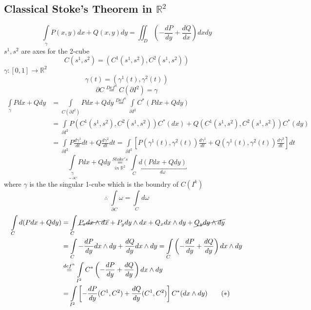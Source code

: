 \documentclass[11pt]{article}
\def\RR{\mathbb{R}}
\begin{document}
\subsection{Classical Stoke's Theorem in $\RR^2$}
\[\int\limits_{\gamma} P(x,y) dx + Q(x,y)dy = \iint_{D} \left( - \frac{dP}{dy} + \frac{dQ}{dx} \right) dxdy\]
$s^1, s^2$ are axes for the 2-cube
 \[C(s^1, s^2) = (C^1(s^1, s^2), C^2(s^1,s^2))\]
$\gamma:[0,1] \rightarrow \RR^2$
\[\gamma(t) = (\gamma^1(t), \gamma^2(t))\]
\[\partial C \overset{Def^n}{=} C(\partial I^2) = \gamma \]
\begin{align*}
\int\limits_{\gamma} P dx + Qdy &= \int\limits_{C(\partial I^2)} P dx + Qdy \overset{Def^n}{=} \int\limits_{\partial I^2} C^*(P dx + Qdy )\\
&= \int\limits_{\partial I^2} P(C^1(s^1, s^2), C^2(s^1,s^2))C^*(dx) +  Q(C^1(s^1, s^2), C^2(s^1,s^2))C^*(dy) \\
&= \int\limits_{\partial I^2} P \frac{d\gamma^1}{dt}dt + Q \frac{d\gamma^2}{dt}dt = \int\limits_{\partial I^2} \left[ P(\gamma^1(t), \gamma^2(t)) \frac{d\gamma^1}{dt} + Q(\gamma^1(t), \gamma^2(t)) \frac{d\gamma^2}{dt}\right]dt
\end{align*}
\[\int\limits_{\underset{= \partial C}{\gamma}} P dx + Qdy \underset{in \;\RR^2}{\overset{Stoke's}{=}} \int\limits_{C} \underbracket{d( P dx + Qdy)}_{d\omega} \]
where $\gamma$ is the the singular 1-cube which is the boundry of $C(I^k)$
\[\therefore \; \int\limits_{\partial C} \omega = \int\limits_{C} d \omega\]
\begin{align*}
\int\limits_{C} d(P dx + Qdy) &= \int\limits_{C}\cancel{P_x dx \wedge dx} + P_y dy \wedge dx + Q_x dx \wedge dy + \cancel{Q_y dy \wedge dy}\\
&= \int\limits_{C} - \frac{dP}{dy} dx \wedge dy + \frac{dQ}{dy} dx \wedge dy  = \int\limits_{C} \left( - \frac{dP}{dy}+ \frac{dQ}{dy} \right) dx \wedge dy\\
&\overset{def^n}{=} \int\limits_{I^2} C^*\left( - \frac{dP}{dy}+ \frac{dQ}{dy} \right) dx \wedge dy \\ &= \int\limits_{I^2} \left[ - \frac{dP}{dy}(C^1, C^2)+ \frac{dQ}{dy}(C^1, C^2) \right] C^*(dx \wedge dy) \qquad (*)
\end{align*}
\end{document}
